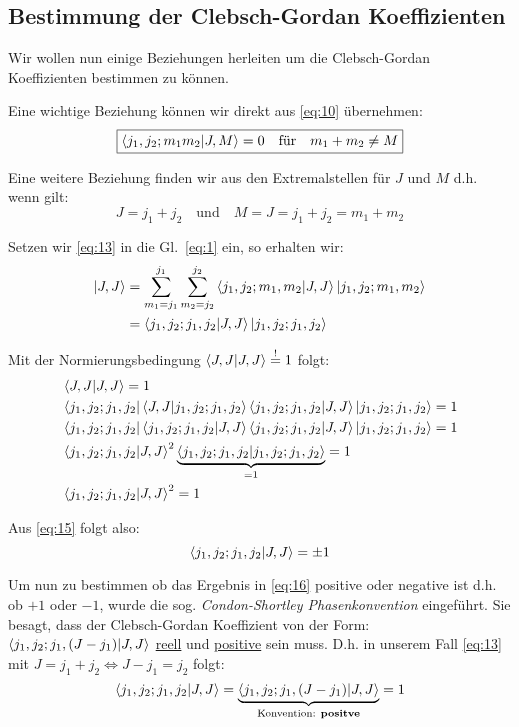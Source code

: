 \subsection*{Bestimmung der Clebsch-Gordan Koeffizienten}
\label{sec:best-der-clebsch}

Wir wollen nun einige Beziehungen herleiten um die Clebsch-Gordan Koeffizienten
bestimmen zu können.

Eine wichtige Beziehung können wir direkt aus \eqref{eq:10} übernehmen:
\begin{equation}
  \label{eq:12}
  \boxed{\braket{j_1,j_2;m_1m_2}{J,M}=0 \quad \text{für} \quad m_1+m_2\neq M}
\end{equation}

Eine weitere Beziehung finden wir aus den Extremalstellen für \(J\) und \(M\)
d.h. wenn gilt:
\begin{equation}
  \label{eq:13}
  J=j_1+j_2 \quad \text{und} \quad M=J=j_1+j_2=m_1+m_2
\end{equation}

Setzen wir \eqref{eq:13} in die Gl.~\eqref{eq:1} ein, so erhalten wir:
\begin{align}
  \label{eq:14}
   \ket{J,J}&=\sum_{m_1=j_1}^{j_1}\sum_{m_2=j_2}^{j_2} 
   \braket{j_1,j_2;m_1,m_2}{J,J}
   \ket{j_1,j_2;m_1,m_2}\notag\\
   &= \braket{j_1,j_2;j_1,j_2}{J,J}
   \ket{j_1,j_2;j_1,j_2}
\end{align}

Mit der Normierungsbedingung \(\braket{J,J}{J,J}\stackrel{!}=1\) folgt:
\begin{align}
  \label{eq:15}
  &\braket{J,J}{J,J}=1\notag\\
  &\bra{j_1,j_2;j_1,j_2} \braket{J,J}{j_1,j_2;j_1,j_2}
  \braket{j_1,j_2;j_1,j_2}{J,J}\ket{j_1,j_2;j_1,j_2}=1\notag\\
  &\bra{j_1,j_2;j_1,j_2} \braket{j_1,j_2;j_1,j_2}{J,J}
  \braket{j_1,j_2;j_1,j_2}{J,J}\ket{j_1,j_2;j_1,j_2}=1\notag\\
  &\braket{j_1,j_2;j_1,j_2}{J,J}^2
  \underbrace{\braket{j_1,j_2;j_1,j_2}{j_1,j_2;j_1,j_2}}_{=1}=1\notag\\
  &\braket{j_1,j_2;j_1,j_2}{J,J}^2=1
\end{align}

Aus \eqref{eq:15} folgt also:
\begin{equation}
  \label{eq:16}
  \braket{j_1,j_2;j_1,j_2}{J,J}=\pm 1
\end{equation}

Um nun zu bestimmen ob das Ergebnis in \eqref{eq:16} positive oder negative ist
d.h. ob \(+1\) oder \(-1\), wurde die sog. \emph{Condon-Shortley
  Phasenkonvention} eingeführt. Sie besagt, dass der Clebsch-Gordan Koeffizient
von der Form:\\
\(\braket{j_1,j_2;j_1,(J-j_1)}{J,J}\) \underline{reell} und \underline{positive}
sein muss. D.h. in unserem Fall \eqref{eq:13} mit \(J=j_1+j_2 \Leftrightarrow
J-j_1=j_2\) folgt:
\begin{equation}
  \label{eq:17}
  \braket{j_1,j_2;j_1,j_2}{J,J}=\underbr{\braket{j_1,j_2;j_1,(J-j_1)}{J,J}}
  _{\text{Konvention: \textbf{positve}}}=1
\end{equation}

